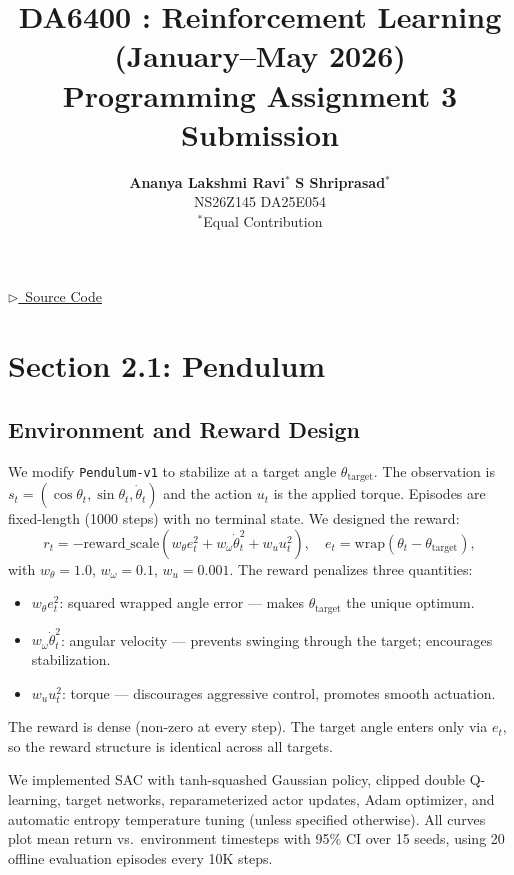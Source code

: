 \documentclass[11pt,a4paper]{article}
\title{\large\textbf{DA6400 : Reinforcement Learning (January--May 2026)\\
Programming Assignment 3 Submission}}
\author{
\textbf{Ananya Lakshmi Ravi}$^{*}$ \quad
\textbf{S Shriprasad}$^{*}$ \\[4pt]
\small NS26Z145 \qquad DA25E054 \\[2pt]
\small $^{*}$Equal Contribution
}
\date{}
\begin{document}
\maketitle

\vspace{-10pt}
\begin{center}
  \href{<PASTE_SOURCE_CODE_LINK_HERE>}{{\color{blue}$\triangleright$~Source Code}}
\end{center}
\vspace{-6pt}

\section{Section 2.1: Pendulum}

\subsection{Environment and Reward Design}

We modify \texttt{Pendulum-v1} to stabilize at a target angle $\theta_{\text{target}}$. The observation is $s_t = (\cos\theta_t, \sin\theta_t, \dot\theta_t)$ and the action $u_t$ is the applied torque. Episodes are fixed-length (1000 steps) with no terminal state. We designed the reward:
\begin{equation}
r_t = -\text{reward\_scale}\left(w_\theta e_t^2 + w_\omega \dot\theta_t^2 + w_u u_t^2\right), \quad e_t = \mathrm{wrap}(\theta_t - \theta_{\text{target}}),
\label{eq:pendulum_reward}
\end{equation}
with $w_\theta=1.0$, $w_\omega=0.1$, $w_u=0.001$. The reward penalizes three quantities:
\begin{itemize}
    \item $w_\theta e_t^2$: squared wrapped angle error --- makes $\theta_{\text{target}}$ the unique optimum.
    \item $w_\omega \dot\theta_t^2$: angular velocity --- prevents swinging through the target; encourages stabilization.
    \item $w_u u_t^2$: torque --- discourages aggressive control, promotes smooth actuation.
\end{itemize}
The reward is dense (non-zero at every step). The target angle enters only via $e_t$, so the reward structure is identical across all targets.

We implemented SAC with tanh-squashed Gaussian policy, clipped double Q-learning, target networks, reparameterized actor updates, Adam optimizer, and automatic entropy temperature tuning (unless specified otherwise). All curves plot mean return vs.\ environment timesteps with 95\% CI over 15 seeds, using 20 offline evaluation episodes every 10K steps.
\end{document}
